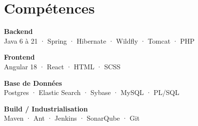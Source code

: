 \section{Compétences}

\small
\textbf{\color{accent}Backend}\\
Java 6 à 21 · Spring · Hibernate · Wildfly · Tomcat · PHP

\vspace{3pt}
\textbf{\color{accent}Frontend}\\
Angular 18 · React · HTML · SCSS

\vspace{3pt}
\textbf{\color{accent}Base de Données}\\
Postgres · Elastic Search · Sybase · MySQL · PL/SQL

\vspace{3pt}
\textbf{\color{accent}Build / Industrialisation}\\
Maven · Ant · Jenkins · SonarQube · Git

